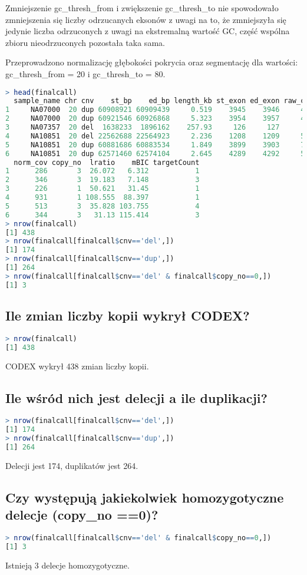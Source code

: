 \documentclass{article}
\begin{document}
Zmniejszenie gc\_thresh\_from i zwiększenie gc\_thresh\_to  nie spowodowało zmniejszenia się liczby odrzucanych eksonów z uwagi na to, że zmniejszyła się jedynie liczba odrzuconych z uwagi na ekstremalną wartość GC, część wspólna zbioru nieodrzuconych pozostała taka sama.

Przeprowadzono normalizację głębokości pokrycia oraz segmentację dla wartości: \\ gc\_thresh\_from = 20 i gc\_thresh\_to = 80.
\begin{lstlisting}[language=R]
> head(finalcall)
  sample_name chr cnv    st_bp    ed_bp length_kb st_exon ed_exon raw_cov
1     NA07000  20 dup 60908921 60909439     0.519    3945    3946     417
2     NA07000  20 dup 60921546 60926868     5.323    3954    3957     474
3     NA07357  20 del  1638233  1896162    257.93     126     127      90
4     NA10851  20 del 22562688 22564923     2.236    1208    1209     515
5     NA10851  20 dup 60881686 60883534     1.849    3899    3903     721
6     NA10851  20 dup 62571460 62574104     2.645    4289    4292     501
  norm_cov copy_no  lratio    mBIC targetCount
1      286       3  26.072   6.312           1
2      346       3  19.183   7.148           3
3      226       1  50.621   31.45           1
4      931       1 108.555  88.397           1
5      513       3  35.828 103.755           4
6      344       3   31.13 115.414           3
> nrow(finalcall)
[1] 438
> nrow(finalcall[finalcall$cnv=='del',])
[1] 174
> nrow(finalcall[finalcall$cnv=='dup',])
[1] 264
> nrow(finalcall[finalcall$cnv=='del' & finalcall$copy_no==0,])
[1] 3
\end{lstlisting}

\subsection{Ile zmian liczby kopii wykrył CODEX?}
\begin{lstlisting}[language=R]
> nrow(finalcall)
[1] 438
\end{lstlisting}
CODEX wykrył 438 zmian liczby kopii.
\subsection{Ile wśród nich jest delecji a ile duplikacji?}
\begin{lstlisting}[language=R]
> nrow(finalcall[finalcall$cnv=='del',])
[1] 174
> nrow(finalcall[finalcall$cnv=='dup',])
[1] 264
\end{lstlisting}
Delecji jest 174, duplikatów jest 264.
\subsection{Czy występują jakiekolwiek homozygotyczne delecje (copy\_no ==0)?}
\begin{lstlisting}[language=R]
> nrow(finalcall[finalcall$cnv=='del' & finalcall$copy_no==0,])
[1] 3
\end{lstlisting}
Istnieją 3 delecje homozygotyczne.
\end{document}
